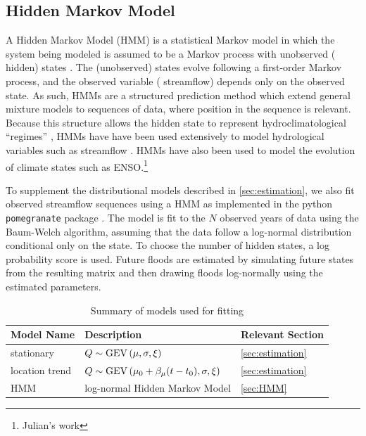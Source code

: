 \documentclass[12pt]{article}
\begin{document}
\subsection{Hidden Markov Model\label{sec:HMM}}

A Hidden Markov Model (HMM) is a statistical Markov model in which the system being modeled is assumed to be a Markov process with unobserved (\ie{} hidden) states \citep{Rabiner1986}.
The (unobserved) states evolve following a first-order Markov process, and the observed variable (\ie{} streamflow) depends only on the observed state.
As such, HMMs are a structured prediction method which extend general mixture models to sequences of data, where position in the sequence is relevant.
Because this structure allows the hidden state to represent hydroclimatological ``regimes'' \citep{Reinhold1982,Michelangeli1995,Merz2014}, HMMs have have been used extensively to model hydrological variables such as streamflow \citep{Bracken2016}.
HMMs have also been used to model the evolution of climate states such as ENSO.\footnote{Julian's work}

To supplement the distributional models described in \cref{sec:estimation}, we also fit observed streamflow sequences using a HMM as implemented in the python \texttt{pomegranate} package \citep{Schreiber2016}.
The model is fit to the \(N\) observed years of data using the Baum-Welch algorithm, assuming that the data follow a log-normal distribution conditional only on the state.
To choose the number of hidden states, a log probability score is used.
Future floods are estimated by simulating future states from the resulting matrix and then drawing floods log-normally using the estimated parameters.

\begin{table}[b]
  \begin{center}
    \begin{tabular}{L{1.0in} L{3.0in} L{1.5in}}
      \toprule
        Model Name & Description & Relevant Section \\
      \midrule
        stationary & \(Q \sim \operatorname{GEV} \qty(\mu, \sigma, \xi)\) & \cref{sec:estimation} \\
        location trend & \(Q \sim \operatorname{GEV} \qty(\mu_0 + \beta_\mu \qty(t-t_0), \sigma, \xi)\) & \cref{sec:estimation} \\
        HMM & log-normal Hidden Markov Model & \cref{sec:HMM} \\
      \bottomrule
    \end{tabular}
  \end{center}
  \caption{Summary of models used for fitting\label{tab:model-fitting}}
\end{table}
\end{document}
